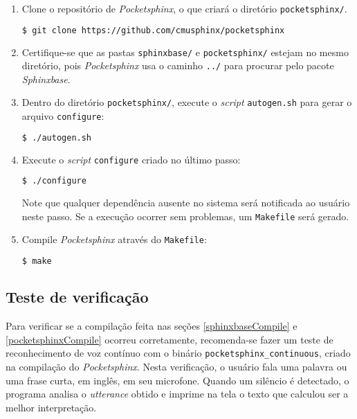 \begin{enumerate}
\item Clone o repositório de \textit{Pocketsphinx}, o que criará o diretório \texttt{pocketsphinx/}.

\begin{lstlisting}[language=Bash]
$ git clone https://github.com/cmusphinx/pocketsphinx
\end{lstlisting}

\item Certifique-se que as pastas \texttt{sphinxbase/} e \texttt{pocketsphinx/} estejam no mesmo diretório, pois \textit{Pocketsphinx} usa o caminho \texttt{../} para procurar pelo pacote \textit{Sphinxbase}.

\item Dentro do diretório \texttt{pocketsphinx/}, execute o \textit{script} \texttt{autogen.sh} para gerar o arquivo \texttt{configure}:

\begin{lstlisting}[language=Bash]
$ ./autogen.sh
\end{lstlisting}

\item Execute o \textit{script} \texttt{configure} criado no último passo:

\begin{lstlisting}[language=Bash]
$ ./configure
\end{lstlisting}

Note que qualquer dependência ausente no sistema será notificada ao usuário neste passo. Se a execução ocorrer sem problemas, um \texttt{Makefile} será gerado.

\item Compile \textit{Pocketsphinx} através do \texttt{Makefile}:

\begin{lstlisting}[language=Bash]
$ make
\end{lstlisting}

\end{enumerate}


\subsection{Teste de verificação}

Para verificar se a compilação feita nas seções \ref{sphinxbaseCompile} e \ref{pocketsphinxCompile} ocorreu corretamente, recomenda-se fazer um teste de reconhecimento de voz contínuo com o binário \texttt{pocketsphinx\_continuous}, criado na compilação do \textit{Pocketsphinx}. Nesta verificação, o usuário fala uma palavra ou uma frase curta, em inglês, em seu microfone. Quando um silêncio é detectado, o programa analisa o \textit{utterance} obtido e imprime na tela o texto que calculou ser a melhor interpretação.

